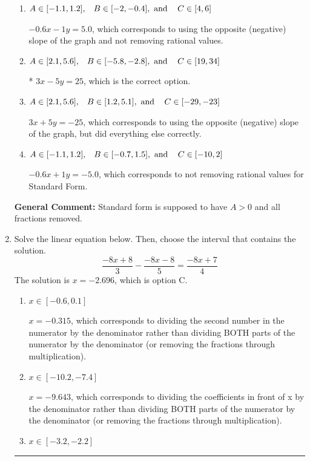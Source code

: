 \documentclass{extbook}[14pt]
\newcommand{\litem}[1]{\item #1

\rule{\textwidth}{0.4pt}}
\begin{document}
\begin{enumerate}
{\begin{enumerate}[label=\Alph*.]
 $-3x + 5y = -25$, which corresponds to not making $A$ positive (by multiplying the equation by $-1$).
\item \( A \in [-1.1, 1.2], \hspace{3mm} B \in [-2, -0.4], \text{ and } \hspace{3mm} C \in [4, 6] \)

 $-0.6x - 1y = 5.0$, which corresponds to using the opposite (negative) slope of the graph and not removing rational values.
\item \( A \in [2.1, 5.6], \hspace{3mm} B \in [-5.8, -2.8], \text{ and } \hspace{3mm} C \in [19, 34] \)

* $3x - 5y = 25$, which is the correct option.
\item \( A \in [2.1, 5.6], \hspace{3mm} B \in [1.2, 5.1], \text{ and } \hspace{3mm} C \in [-29, -23] \)

 $3x + 5y = -25$, which corresponds to using the opposite (negative) slope of the graph, but did everything else correctly.
\item \( A \in [-1.1, 1.2], \hspace{3mm} B \in [-0.7, 1.5], \text{ and } \hspace{3mm} C \in [-10, 2] \)

 $-0.6x + 1y = -5.0$, which corresponds to not removing rational values for Standard Form.
\end{enumerate}

\textbf{General Comment:} Standard form is supposed to have $A > 0$ and all fractions removed.
}
\litem{
Solve the linear equation below. Then, choose the interval that contains the solution.
\[ \frac{-8x + 8}{3} - \frac{-8x -8}{5} = \frac{-8x + 7}{4} \]The solution is \( x = -2.696 \), which is option C.\begin{enumerate}[label=\Alph*.]
\item \( x \in [-0.6, 0.1] \)

 $x = -0.315$, which corresponds to dividing the second number in the numerator by the denominator rather than dividing BOTH parts of the numerator by the denominator (or removing the fractions through multiplication).
\item \( x \in [-10.2, -7.4] \)

 $x = -9.643$, which corresponds to dividing the coefficients in front of x by the denominator rather than dividing BOTH parts of the numerator by the denominator (or removing the fractions through multiplication).
\item \( x \in [-3.2, -2.2] \)


\end{enumerate}}
\end{enumerate}
\end{document}
